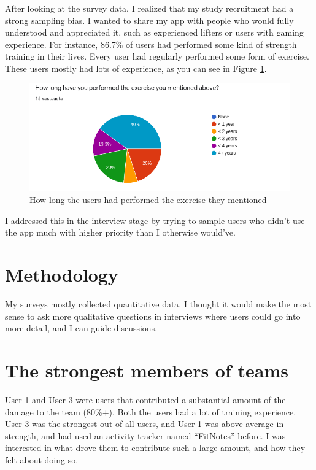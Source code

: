 \documentclass{l4proj}
\begin{document}
After looking at the survey data, I realized that my study recruitment had a strong sampling bias. I wanted to share my app with people who would fully understood and appreciated it, such as experienced lifters or users with gaming experience. For instance, 86.7\% of users had performed some kind of strength training in their lives. Every user had regularly performed some form of exercise. These users mostly had lots of experience, as you can see in Figure \ref{fig:character_motivation}.
\begin{figure}[H]
    \centering
    \includegraphics[width=1.0\linewidth]{long_performed.png}    
    \caption{How long the users had performed the exercise they mentioned}
    \label{fig:character_motivation} 
\end{figure}

I addressed this in the interview stage by trying to sample users who didn't use the app much with higher priority than I otherwise would've. 

\section{Methodology}
My surveys mostly collected quantitative data. I thought it would make the most sense to ask more qualitative questions in interviews where users could go into more detail, and I can guide discussions. 

\section{The strongest members of teams}
User 1 and User 3 were users that contributed a substantial amount of the damage to the team (80\%+). Both the users had a lot of training experience. User 3 was the strongest out of all users, and User 1 was above average in strength, and had used an activity tracker named ``FitNotes'' before. I was interested in what drove them to contribute such a large amount, and how they felt about doing so. 
\end{document}

